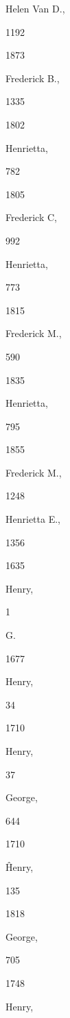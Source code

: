 \documentclass{book}
\begin{document}
{Helen Van D., 


1192 


1873 


Frederick B., 


1335 


1802 


Henrietta, 


782 


1805 


Frederick C, 


992 




Henrietta, 


773 


1815 


Frederick M., 


590 


1835 


Henrietta, 


795 


1855 


Frederick M., 


1248 




Henrietta E., 


1356 








1635 


Henry, 


1 




G. 




1677 


Henry, 


34 








1710 


Henry, 


37 




George, 


644 


1710 


\^ Henry, 


135 


1818 


George, 


705 


1748 


Henry, 


}
\end{document}
